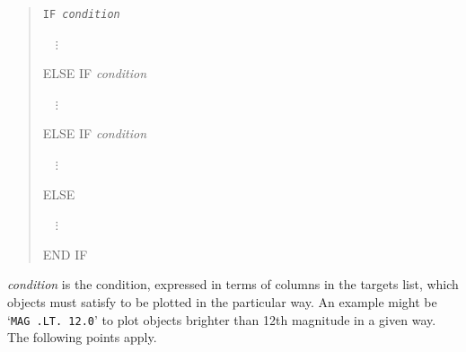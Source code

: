 \documentclass[twoside,11pt]{article}
\renewcommand{\_}{\texttt{\symbol{95}}}
\begin{document}
\begin{quote}
{\tt IF {\it condition}

~~$\vdots$

ELSE IF {\it condition}

~~$\vdots$

ELSE IF {\it condition}

~~$\vdots$

ELSE

~~$\vdots$

END IF}
\end{quote}

{\it condition} is the condition, expressed in terms of columns in the
targets list, which objects must satisfy to be plotted in the particular
way.  An example might be `{\tt MAG .LT. 12.0}' to plot objects brighter
than 12th magnitude in a given way.  The following points apply.
\end{document}
